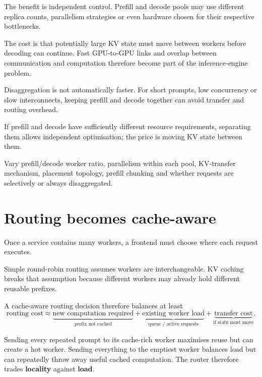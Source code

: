 The benefit is independent control.
Prefill and decode pools may use different replica counts, parallelism strategies or even hardware chosen for their respective bottlenecks.

The cost is that potentially large KV state must move between workers before decoding can continue.
Fast GPU-to-GPU links and overlap between communication and computation therefore become part of the inference-engine problem.

Disaggregation is not automatically faster.
For short prompts, low concurrency or slow interconnects, keeping prefill and decode together can avoid transfer and routing overhead.

\begin{calloutbias}
If prefill and decode have sufficiently different resource requirements, separating them allows independent optimisation; the price is moving KV state between them.
\end{calloutbias}

\begin{calloutdegreeofexperiment}
Vary prefill/decode worker ratio, parallelism within each pool, KV-transfer mechanism, placement topology, prefill chunking and whether requests are selectively or always disaggregated.
\end{calloutdegreeofexperiment}


\section{Routing becomes cache-aware}
\label{sec:inference-kv-routing}
Once a service contains many workers, a frontend must choose where each request executes.

Simple round-robin routing assumes workers are interchangeable.
KV caching breaks that assumption because different workers may already hold different reusable prefixes.

A cache-aware routing decision therefore balances at least
\[
\boxed{
\text{routing cost}
\approx
\underbrace{\text{new computation required}}_{\text{prefix not cached}}
+
\underbrace{\text{existing worker load}}_{\text{queue / active requests}}
+
\underbrace{\text{transfer cost}}_{\text{if state must move}}
}.
\]

Sending every repeated prompt to its cache-rich worker maximises reuse but can create a hot worker.
Sending everything to the emptiest worker balances load but can repeatedly throw away useful cached computation.
The router therefore trades \textbf{locality} against \textbf{load}.

